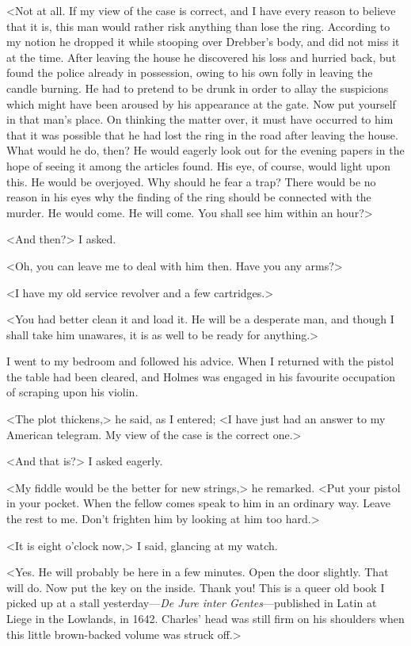 <Not at all. If my view of the case is correct, and I have every reason to believe that it is, this man would rather risk anything than lose the ring. According to my notion he dropped it while stooping over Drebber's body, and did not miss it at the time. After leaving the house he discovered his loss and hurried back, but found the police already in possession, owing to his own folly in leaving the candle burning. He had to pretend to be drunk in order to allay the suspicions which might have been aroused by his appearance at the gate. Now put yourself in that man's place. On thinking the matter over, it must have occurred to him that it was possible that he had lost the ring in the road after leaving the house. What would he do, then? He would eagerly look out for the evening papers in the hope of seeing it among the articles found. His eye, of course, would light upon this. He would be overjoyed. Why should he fear a trap? There would be no reason in his eyes why the finding of the ring should be connected with the murder. He would come. He will come. You shall see him within an hour?>

<And then?> I asked.

<Oh, you can leave me to deal with him then. Have you any arms?>

<I have my old service revolver and a few cartridges.>

<You had better clean it and load it. He will be a desperate man, and though I shall take him unawares, it is as well to be ready for anything.>

I went to my bedroom and followed his advice. When I returned with the pistol the table had been cleared, and Holmes was engaged in his favourite occupation of scraping upon his violin.

<The plot thickens,> he said, as I entered; <I have just had an answer to my American telegram. My view of the case is the correct one.>

<And that is?> I asked eagerly.

<My fiddle would be the better for new strings,> he remarked. <Put your pistol in your pocket. When the fellow comes speak to him in an ordinary way. Leave the rest to me. Don't frighten him by looking at him too hard.>

<It is eight o'clock now,> I said, glancing at my watch.

<Yes. He will probably be here in a few minutes. Open the door slightly. That will do. Now put the key on the inside. Thank you! This is a queer old book I picked up at a stall yesterday—\textit{De Jure inter Gentes}—published in Latin at Liege in the Lowlands, in 1642. Charles' head was still firm on his shoulders when this little brown-backed volume was struck off.>

